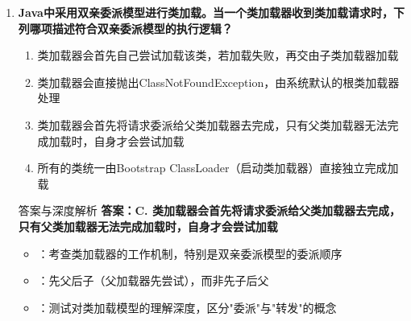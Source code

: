 \documentclass[12pt, a4paper]{ctexart}
\begin{document}
\begin{enumerate}[label=\textbf{\arabic*.}]
\begin{bluebox}{答案与深度解析}
\begin{itemize}[leftmargin=*, nosep]
			      \item {}：
			            \begin{itemize}
				            \item javap -c输出的字节码是JVM指令集的一部分，约200条指令
				            \item 常用指令：aload、astore、invokevirtual、getstatic、putfield等
				            \item 可以通过字节码分析代码性能，如循环展开、方法内联等
			            \end{itemize}
		      \end{itemize}
	      \end{bluebox}

	      \newpage

	\item \textbf{Java中采用双亲委派模型进行类加载。当一个类加载器收到类加载请求时，下列哪项描述符合双亲委派模型的执行逻辑？}
	      \begin{enumerate}[label=\Alph*.]
		      \item 类加载器会首先自己尝试加载该类，若加载失败，再交由子类加载器加载
		      \item 类加载器会直接抛出ClassNotFoundException，由系统默认的根类加载器处理
		      \item 类加载器会首先将请求委派给父类加载器去完成，只有父类加载器无法完成加载时，自身才会尝试加载
		      \item 所有的类统一由Bootstrap ClassLoader（启动类加载器）直接独立完成加载
	      \end{enumerate}

	      \begin{bluebox}{答案与深度解析}
		      \textbf{答案：C. 类加载器会首先将请求委派给父类加载器去完成，只有父类加载器无法完成加载时，自身才会尝试加载}

		      \begin{itemize}[leftmargin=*, nosep]
			      \item {}：考查类加载器的工作机制，特别是双亲委派模型的委派顺序
			      \item {}：先父后子（父加载器先尝试），而非先子后父
			      \item {}：测试对类加载模型的理解深度，区分"委派"与"转发"的概念
		      \end{itemize}



\end{bluebox}
\end{enumerate}
\end{document}
